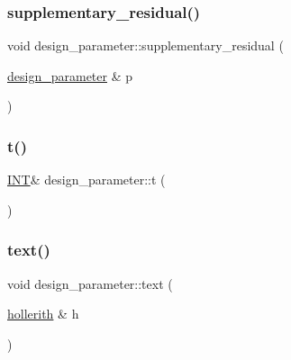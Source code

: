 \mbox{\label{classdesign__parameter_a5bbeb7775c2bd761d50a7b32044d6963}} 
\subsubsection{\texorpdfstring{supplementary\+\_\+residual()}{supplementary\_residual()}}
{\footnotesize\ttfamily void design\+\_\+parameter\+::supplementary\+\_\+residual (\begin{DoxyParamCaption}\item[{\mbox{\hyperlink{classdesign__parameter}{design\+\_\+parameter}} \&}]{p }\end{DoxyParamCaption})}

\mbox{\label{classdesign__parameter_acf428913d279e62bcadc66b34303ece2}} 
\subsubsection{\texorpdfstring{t()}{t()}}
{\footnotesize\ttfamily \mbox{\hyperlink{galois_8h_a09fddde158a3a20bd2dcadb609de11dc}{I\+NT}}\& design\+\_\+parameter\+::t (\begin{DoxyParamCaption}{ }\end{DoxyParamCaption})\hspace{0.3cm}{\ttfamily [inline]}}

\mbox{\label{classdesign__parameter_a200510dc60483800cc6985b77d4ee50c}} 
\subsubsection{\texorpdfstring{text()}{text()}}
{\footnotesize\ttfamily void design\+\_\+parameter\+::text (\begin{DoxyParamCaption}\item[{\mbox{\hyperlink{classhollerith}{hollerith}} \&}]{h }\end{DoxyParamCaption})}

